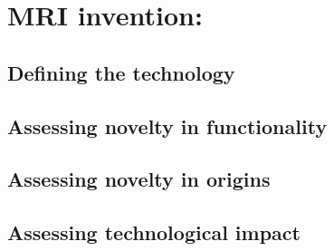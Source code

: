 \section{MRI invention: }
\subsection{Defining the technology}

\subsection{Assessing novelty in functionality}

\subsection{Assessing novelty in origins}

\subsection{Assessing technological impact}